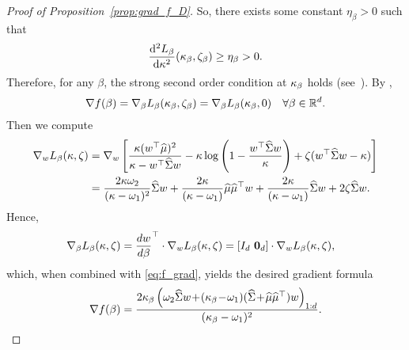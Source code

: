 \documentclass{article}
\begin{document}
\begin{proof}[Proof of Proposition~\ref{prop:grad_f_D}]
So, there exists some constant $\eta_{\beta} > 0$ such that
\begin{equation*}
\frac{\mathrm d^2 L_{\beta}}{\mathrm d\kappa^2}(\kappa_{\beta} , \zeta_{\beta}) \ge \eta_{\beta} >0.
\end{equation*}
Therefore, for any $\beta$, the strong second order condition at $\kappa_{\beta}$ holds (see~\citet[Definition 6.2]{still2018lectures}). By \citet[Theorem 6.7]{still2018lectures},
\begin{equation}\label{eq:f_grad}
\nabla f (\beta) = \nabla_\beta L_\beta (\kappa_\beta , \zeta_\beta) = \nabla_\beta L_\beta (\kappa_\beta , 0)\quad \forall \beta\in \mathbb{R}^d.
\end{equation}
Then we compute
\begin{align*}
\nabla_w L_{\beta} (\kappa, \zeta) & = \nabla_w \left[ \frac{\kappa (w^\top \widehat {\mu})^2}{\kappa - w^\top \widehat{\Sigma} w } - \kappa \log \left( 1 - \frac{w^\top \widehat{\Sigma} w}{\kappa}  \right) + \zeta (w^\top \widehat{\Sigma} w - \kappa) \right] \\
& = \frac{2\kappa \omega_2}{(\kappa - \omega_1)^2} \widehat{\Sigma} w + \frac{2\kappa}{(\kappa - \omega_1)} \widehat {\mu} \widehat {\mu}^\top w + \frac{2\kappa}{(\kappa - \omega_1)} \widehat{\Sigma} w + 2\zeta \widehat{\Sigma} w.
\end{align*}
Hence,
\begin{align*}
&\, \nabla_\beta L_\beta (\kappa, \zeta) = \frac{d w}{d\beta}^\top \cdot \nabla_w L_{\beta} (\kappa, \zeta) = [I_d \ \mathbf{0}_d ] \cdot \nabla_w L_{\beta} (\kappa, \zeta),
\end{align*}
which, when combined with \eqref{eq:f_grad}, yields the desired gradient formula
\begin{equation*}
\nabla f (\beta) = \frac{2\dualvar_\beta \left(  \omega_2  \covsa w \!+\! (\dualvar_\beta \! - \!\omega_1 ) (\covsa \! +\! \msa \msa^\top) w \right)_{1:d}}{(\dualvar_\beta  - \omega_1 )^2}.

\end{equation*}
\end{proof}
\end{document}
